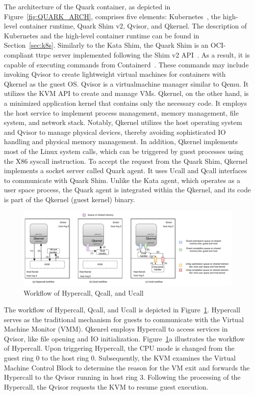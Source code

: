 The architecture of the Quark container, as depicted in Figure~\ref{fig:QUARK_ARCH}, comprises five elements: Kubernetes~\cite*{k8s}, the high-level container runtime, Quark Shim v2, Qvisor, and Qkernel. The description of Kubernetes and the high-level container runtime can be found in Section~\ref{sec:k8s}. 
Similarly to the Kata Shim, the Quark Shim is an OCI-compliant ttrpc server implemented following the Shim v2 API~\cite*{shim_v2}. As a result, it is capable of executing commands from Containerd~\cite*{containerd}. These commands may include invoking Qvisor to create lightweight virtual machines for 
containers with Qkernel as the guest OS. Qvisor is a virtualmachine manager similar to Qemu. It utilizes the KVM API to create and manage VMs. Qkernel, on the other hand, is a minimized application kernel that contains only the necessary code. It employs the host service to implement process 
management, memory management, file system, and network stack. Notably, Qkernel utilizes the host operating system and Qvisor to manage physical devices, thereby avoiding sophisticated IO handling and physical memory management. In addition, Qkernel implements most of the Linux system calls, which can be triggered by 
guest processes using the X86 syscall instruction. To accept the request from the Quark Shim,  Qkernel implements a socket server called Quark agent. It uses Ucall 
and Qcall interfaces to communicate with Quark Shim. Unlike the Kata agent, which operates as a user space process, the Quark agent is integrated within the Qkernel, and its code is part of the Qkernel (guest kernel) binary.



\begin{figure}[htp]
  \centering
  \includegraphics[width=1\textwidth]{images/hypercall_qcall_ucall.pdf}
  \caption[Workflow of Hypercall, Qcall, and Ucall]{Workflow of Hypercall, Qcall, and Ucall}
  \label{fig:hypercall_qcall_ucall}
\end{figure}


The workflow of Hypercall, Qcall, and Ucall is depicted in Figure~\ref{fig:hypercall_qcall_ucall}. Hypercall serves as the traditional mechanism for guests to communicate with the Virtual Machine Monitor (VMM). Qkenrel employs Hypercall to access services in Qvisor, like file opening and IO 
initialization. Figure~\ref{fig:hypercall_qcall_ucall}a illustrates the workflow of Hypercall. Upon triggering Hypercall, the CPU mode is changed from the guest ring 0  to the host ring 0. Subsequently, the KVM examines the Virtual Machine Control Block to determine the reason for the VM exit and 
forwards the Hypercall to the Qvisor running in host ring 3. Following the processing of the Hypercall, the Qvisor requests the KVM to resume guest execution.

